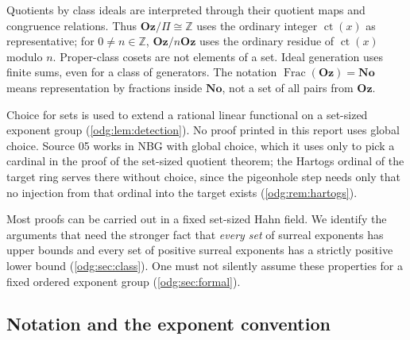 \documentclass[11pt,oneside]{article}
\numberwithin{equation}{section}
\theoremstyle{definition}
\theoremstyle{remark}
\newcommand{\No}{\mathbf{No}}
\newcommand{\Oz}{\mathbf{Oz}}
\newcommand{\Z}{\mathbb Z}
\newcommand{\ct}{\operatorname{ct}}
\newcommand{\Frac}{\operatorname{Frac}}
\begin{document}
Quotients by class ideals are interpreted through their quotient maps and
congruence relations. Thus $\Oz/\Pi\cong\Z$ uses the ordinary integer
$\ct(x)$ as representative; for $0\ne n\in\Z$, $\Oz/n\Oz$ uses the ordinary
residue of $\ct(x)$ modulo $n$. Proper-class cosets are not elements of a
set. Ideal generation uses finite sums, even for a class of generators.
The notation $\Frac(\Oz)=\No$ means representation by fractions inside
$\No$, not a set of all pairs from $\Oz$.

Choice for sets is used to extend a rational linear functional on a
set-sized exponent group (\cref{odg:lem:detection}). No proof printed in this
report uses global choice. Source 05 works in NBG with global choice, which it
uses only to pick a cardinal in the proof of the set-sized quotient theorem;
the Hartogs ordinal of the target ring serves there without choice, since the
pigeonhole step needs only that no injection from that ordinal into the target
exists (\cref{odg:rem:hartogs}).

Most proofs can be carried out in a fixed set-sized Hahn field. We identify
the arguments that need the stronger fact that \emph{every set} of surreal
exponents has upper bounds and every set of positive surreal exponents has a
strictly positive lower bound (\cref{odg:sec:class}). One must not silently
assume these properties for a fixed ordered exponent group
(\cref{odg:sec:formal}).

\subsection{Notation and the exponent convention}\label{odg:sub:notation}
\end{document}

